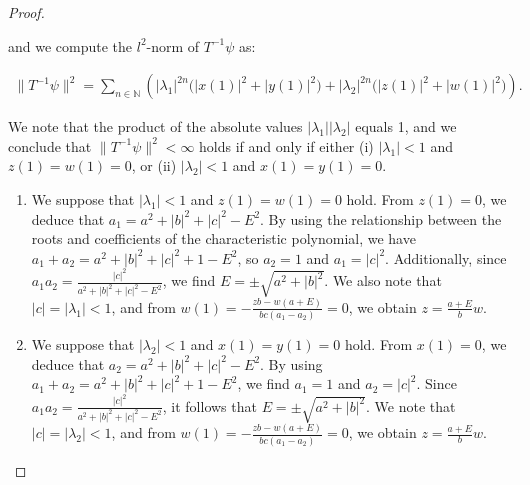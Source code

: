 \documentclass{amsart}
\theoremstyle{definition}
\theoremstyle{remark}
\begin{document}
\begin{proof}
\begin{enumerate}
    and we compute the \(l^2\)-norm of \(T^{-1} \psi\) as:

    \begin{align*}
    \| T^{-1} \psi \|^2 = \sum_{n \in \mathbb{N}} \left( |\lambda_1|^{2n} \big( |x(1)|^2 + |y(1)|^2 \big) + |\lambda_2|^{2n} \big( |z(1)|^2 + |w(1)|^2 \big) \right).
    \end{align*}

    We note that the product of the absolute values \(|\lambda_1| |\lambda_2|\) equals 1, and we conclude that \(\| T^{-1} \psi \|^2 < \infty\) holds if and only if either (i) \(|\lambda_1| < 1\) and \(z(1) = w(1) = 0\), or (ii) \(|\lambda_2| < 1\) and \(x(1) = y(1) = 0\).

    \begin{enumerate}
        \item We suppose that \(|\lambda_1| < 1\) and \(z(1) = w(1) = 0\) hold. From \(z(1) = 0\), we deduce that \(a_1 = a^2 + |b|^2 + |c|^2 - E^2\). By using the relationship between the roots and coefficients of the characteristic polynomial, we have \(a_1 + a_2 = a^2 + |b|^2 + |c|^2 + 1 - E^2\), so \(a_2 = 1\) and \(a_1 = |c|^2\). Additionally, since \(a_1 a_2 = \frac{|c|^2}{a^2 + |b|^2 + |c|^2 - E^2}\), we find \(E = \pm \sqrt{a^2 + |b|^2}\). We also note that \(|c| = |\lambda_1| < 1\), and from \(w(1) = -\frac{z b - w (a + E)}{b c (a_1 - a_2)} = 0\), we obtain \(z = \frac{a + E}{b} w\).

        \item We suppose that \(|\lambda_2| < 1\) and \(x(1) = y(1) = 0\) hold. From \(x(1) = 0\), we deduce that \(a_2 = a^2 + |b|^2 + |c|^2 - E^2\). By using \(a_1 + a_2 = a^2 + |b|^2 + |c|^2 + 1 - E^2\), we find \(a_1 = 1\) and \(a_2 = |c|^2\). Since \(a_1 a_2 = \frac{|c|^2}{a^2 + |b|^2 + |c|^2 - E^2}\), it follows that \(E = \pm \sqrt{a^2 + |b|^2}\). We note that \(|c| = |\lambda_2| < 1\), and from \(w(1) = -\frac{z b - w (a + E)}{b c (a_1 - a_2)} = 0\), we obtain \(z = \frac{a + E}{b} w\).
    \end{enumerate}


\end{enumerate}
\end{proof}
\end{document}
